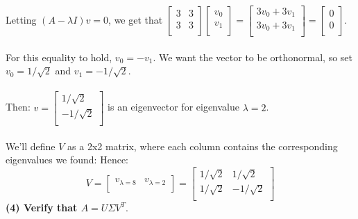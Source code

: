 \documentclass[11pt]{article}
\begin{document}
Letting $(A - \lambda I)v = 0$, we get that $ \begin{bmatrix}
3 & 3 \\
3 & 3 \\
\end{bmatrix} \begin{bmatrix}
v_0 \\
v_1 \\
\end{bmatrix} = \begin{bmatrix}
3v_0 + 3v_1 \\
3v_0 + 3v_1 \\
\end{bmatrix} = \begin{bmatrix}
0 \\
0 \\
\end{bmatrix} $. \\\\
For this equality to hold, $v_0 = -v_1$. We want the vector to be orthonormal, so set $v_0 = 1 / \sqrt2$ and $v_1 = - 1 / \sqrt2.$ \\\\
Then: $v = \begin{bmatrix}
1 / \sqrt2 \\
- 1 / \sqrt2 \\
\end{bmatrix}$ is an eigenvector for eigenvalue $\lambda = 2$. \\\\
We'll define $V$ as a 2x2 matrix, where each column contains the corresponding eigenvalues we found:
Hence:
$$ \boxed{ V = \begin{bmatrix} 
v_{\lambda = 8} & v_{\lambda = 2} \\
\end{bmatrix} = \begin{bmatrix}
1 / \sqrt2 & 1 / \sqrt2 \\
1 / \sqrt2 & -1 / \sqrt2 \\
\end{bmatrix}}$$
\textbf{(4) Verify that $A = U \Sigma V^T.$}
\end{document}
